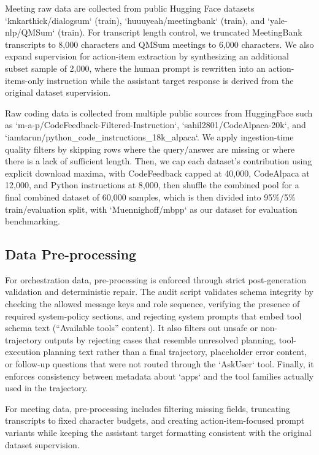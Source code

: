 \documentclass[conference]{IEEEtran}
\begin{document}
Meeting raw data are collected from public Hugging Face datasets `knkarthick/dialogsum` (train), `huuuyeah/meetingbank` (train), and `yale-nlp/QMSum` (train). For transcript length control, we truncated MeetingBank transcripts to 8,000 characters and QMSum meetings to 6,000 characters. We also expand supervision for action-item extraction by synthesizing an additional subset sample of 2,000, where the human prompt is rewritten into an action-items-only instruction while the assistant target response is derived from the original dataset supervision.

Raw coding data is collected from multiple public sources from HuggingFace such as `m-a-p/CodeFeedback-Filtered-Instruction`, `sahil2801/CodeAlpaca-20k`, and `iamtarun/python\_code\_instructions\_18k\_alpaca`. We apply ingestion-time quality filters by skipping rows where the query/answer are missing or where there is a lack of sufficient length. Then, we cap each dataset’s contribution using explicit download maxima, with CodeFeedback capped at 40,000, CodeAlpaca at 12,000, and Python instructions at 8,000, then shuffle the combined pool for a final combined dataset of 60,000 samples, which is then divided into 95\%/5\% train/evaluation split, with `Muennighoff/mbpp` as our dataset for evaluation benchmarking.


\subsection{Data Pre-processing}
For orchestration data, pre-processing is enforced through strict post-generation validation and deterministic repair. The audit script validates schema integrity by checking the allowed message keys and role sequence, verifying the presence of required system-policy sections, and rejecting system prompts that embed tool schema text (“Available tools” content). It also filters out unsafe or non-trajectory outputs by rejecting cases that resemble unresolved planning, tool-execution planning text rather than a final trajectory, placeholder error content, or follow-up questions that were not routed through the `AskUser` tool. Finally, it enforces consistency between metadata about `apps` and the tool families actually used in the trajectory.

For meeting data, pre-processing includes filtering missing fields, truncating transcripts to fixed character budgets, and creating action-item-focused prompt variants while keeping the assistant target formatting consistent with the original dataset supervision.
\end{document}
